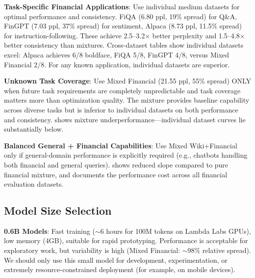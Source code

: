 \textbf{Task-Specific Financial Applications}: Use individual medium datasets for optimal performance and consistency. FiQA (6.80 ppl, 19\% spread) for Q\&A, FinGPT (7.03 ppl, 37\% spread) for sentiment, Alpaca (8.73 ppl, 11.5\% spread) for instruction-following. These achieve 2.5–3.2$\times$ better perplexity and 1.5–4.8$\times$ better consistency than mixtures. Cross-dataset tables show individual datasets excel: Alpaca achieves 6/8 boldface, FiQA 5/8, FinGPT 4/8, versus Mixed Financial 2/8. For any known application, individual datasets are superior.

\textbf{Unknown Task Coverage}: Use Mixed Financial (21.55 ppl, 55\% spread) ONLY when future task requirements are completely unpredictable and task coverage matters more than optimization quality. The mixture provides baseline capability across diverse tasks but is inferior to individual datasets on both performance and consistency.  shows mixture underperformance—individual dataset curves lie substantially below.

\textbf{Balanced General + Financial Capabilities}: Use Mixed Wiki+Financial only if general-domain performance is explicitly required (e.g., chatbots handling both financial and general queries).  shows reduced slope compared to pure financial mixture, and  documents the performance cost across all financial evaluation datasets.


\subsection{Model Size Selection}

\textbf{0.6B Models}: Fast training ($\sim$6 hours for 100M tokens on Lambda Labs GPUs), low memory (4GB), suitable for rapid prototyping. Performance is acceptable for exploratory work, but variability is high (Mixed Financial: $\sim$98\% relative spread). We should only use this small model for development, experimentation, or extremely resource-constrained deployment (for example, on mobile devices).

